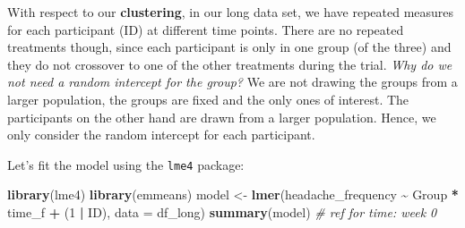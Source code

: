 \documentclass[
]{book}
\newenvironment{Shaded}{\begin{snugshade}}{\end{snugshade}}
\newcommand{\AttributeTok}[1]{\textcolor[rgb]{0.13,0.29,0.53}{#1}}
\newcommand{\CommentTok}[1]{\textcolor[rgb]{0.56,0.35,0.01}{\textit{#1}}}
\newcommand{\DecValTok}[1]{\textcolor[rgb]{0.00,0.00,0.81}{#1}}
\newcommand{\FunctionTok}[1]{\textcolor[rgb]{0.13,0.29,0.53}{\textbf{#1}}}
\newcommand{\NormalTok}[1]{#1}
\newcommand{\OtherTok}[1]{\textcolor[rgb]{0.56,0.35,0.01}{#1}}
\newcommand{\SpecialCharTok}[1]{\textcolor[rgb]{0.81,0.36,0.00}{\textbf{#1}}}
\begin{document}
With respect to our \textbf{clustering}, in our long data set,
we have repeated measures for each participant (ID) at different time points.
There are no repeated treatments though, since each participant
is only in one group (of the three) and they do not crossover to
one of the other treatments during the trial.
\emph{Why do we not need a random intercept for the group?}
We are not drawing the groups from a larger population,
the groups are fixed and the only ones of interest.
The participants on the other hand are
drawn from a larger population.
Hence, we only consider the random intercept for each participant.

Let's fit the model using the \texttt{lme4} package:

\begin{Shaded}
\begin{Highlighting}[]
\FunctionTok{library}\NormalTok{(lme4)}
\FunctionTok{library}\NormalTok{(emmeans)}
\NormalTok{model }\OtherTok{\textless{}{-}} \FunctionTok{lmer}\NormalTok{(headache\_frequency }\SpecialCharTok{\textasciitilde{}}\NormalTok{ Group }\SpecialCharTok{*}\NormalTok{ time\_f }\SpecialCharTok{+}\NormalTok{ (}\DecValTok{1} \SpecialCharTok{|}\NormalTok{ ID),}
              \AttributeTok{data =}\NormalTok{ df\_long)}
\FunctionTok{summary}\NormalTok{(model) }\CommentTok{\# ref for time: week 0}
\end{Highlighting}
\end{Shaded}
\end{document}
